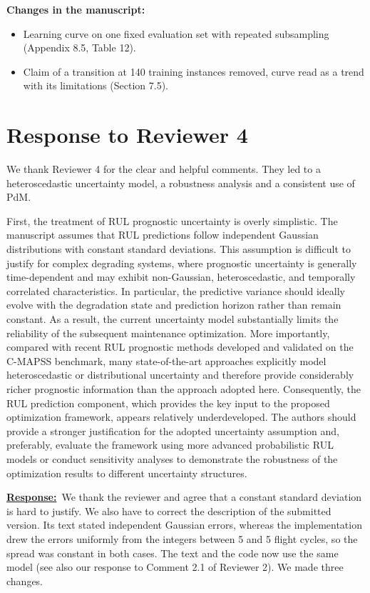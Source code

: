 \documentclass{article}
\newcommand{\response}{\vspace{0.1cm}\noindent\underline{\textbf{Response:}}\ }
\newcommand{\changes}{\vspace{0.1cm}\noindent\textbf{Changes in the manuscript:}}
\begin{document}
\changes
\begin{itemize}[nosep]
\item Learning curve on one fixed evaluation set with repeated subsampling (Appendix 8.5, Table 12).
\item Claim of a transition at 140 training instances removed, curve read as a trend with its limitations (Section 7.5).
\end{itemize}



\newpage
\section{Response to Reviewer 4}

We thank Reviewer 4 for the clear and helpful comments. They led to a heteroscedastic uncertainty model, a robustness analysis and a consistent use of PdM.

\begin{cmt}{}{}
First, the treatment of RUL prognostic uncertainty is overly simplistic. The manuscript assumes that RUL predictions follow independent Gaussian distributions with constant standard deviations. This assumption is difficult to justify for complex degrading systems, where prognostic uncertainty is generally time-dependent and may exhibit non-Gaussian, heteroscedastic, and temporally correlated characteristics. In particular, the predictive variance should ideally evolve with the degradation state and prediction horizon rather than remain constant. As a result, the current uncertainty model substantially limits the reliability of the subsequent maintenance optimization. More importantly, compared with recent RUL prognostic methods developed and validated on the C-MAPSS benchmark, many state-of-the-art approaches explicitly model heteroscedastic or distributional uncertainty and therefore provide considerably richer prognostic information than the approach adopted here. Consequently, the RUL prediction component, which provides the key input to the proposed optimization framework, appears relatively underdeveloped. The authors should provide a stronger justification for the adopted uncertainty assumption and, preferably, evaluate the framework using more advanced probabilistic RUL models or conduct sensitivity analyses to demonstrate the robustness of the optimization results to different uncertainty structures.
\end{cmt}

\response We thank the reviewer and agree that a constant standard deviation is hard to justify. We also have to correct the description of the submitted version. Its text stated independent Gaussian errors, whereas the implementation drew the errors uniformly from the integers between \textminus{}5 and 5 flight cycles, so the spread was constant in both cases. The text and the code now use the same model (see also our response to Comment 2.1 of Reviewer 2). We made three changes.
\end{document}
